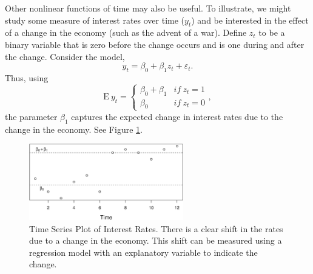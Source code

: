 \linejed

Other nonlinear functions of time may also be useful. To illustrate,
we might study some measure of interest rates over time ($y_t$) and
be interested in the effect of a change in the economy (such as the
advent of a war). Define $z_t$ to be a binary variable that is zero
before the change occurs and is one during and after the change.
Consider the model,
\begin{equation} \label{E7:4}
y_t = \beta_0 + \beta_1 z_t + \varepsilon_t.
\end{equation}
Thus, using
\begin{equation*}
\mathrm{E~}y_t = \left\{
\begin{array}{ll}
\beta_0 + \beta_1 & if~z_t=1 \\
\beta_0 & if~z_t = 0
\end{array}
\right. ,
\end{equation*}
the parameter $\beta_1$ captures the expected change in interest
rates due to the change in the economy. See Figure
\ref{F7:RegimeSwitch}.


\begin{figure}[htp]
  \begin{center}
    \includegraphics[width=0.6\textwidth]{Chapter7Trend/RegimeSwitch.eps}
    \caption{\label{F7:RegimeSwitch} \small Time
Series Plot of Interest Rates. There is a clear shift in the rates
due to a change in the economy. This shift can be measured using a
regression model with an explanatory variable to indicate the
change.}
  \end{center}
\end{figure}

\linejed


